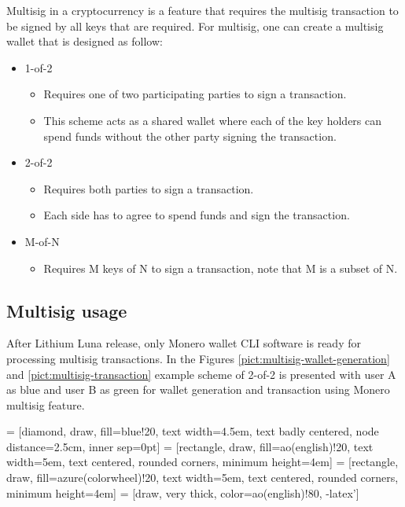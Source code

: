 \documentclass[
  printed, %
  table,   %
  nolof,     %
  nolot,     %
           oneside, color
]{fithesis3}
\begin{document}
Multisig in a cryptocurrency is a feature that requires the multisig transaction to be signed by all keys that are required. For multisig, one can create a multisig wallet that is designed as follow:
\begin{itemize}\itemsep0em
\item 1-of-2 
\begin{itemize}\itemsep0em \item Requires one of two participating parties to sign a transaction. \item This scheme acts as a shared wallet where each of the key holders can spend funds without the other party signing the transaction. \end{itemize}
\item 2-of-2 \begin{itemize}\itemsep0em \item  Requires both parties to sign a transaction. \item Each side has to agree to spend funds and sign the transaction.\end{itemize}
\item M-of-N \begin{itemize}\itemsep0em \item  Requires M keys of N to sign a transaction, note that M is a subset of N. \end{itemize}
\end{itemize}

\subsection{Multisig usage}
After Lithium Luna release, only Monero wallet CLI software is ready for processing multisig transactions. In the Figures \ref{pict:multisig-wallet-generation} and \ref{pict:multisig-transaction} example scheme of 2-of-2 is presented with user A as blue and user B as green for wallet generation and transaction using Monero multisig feature. 


\newpage
{}
 = [diamond, draw, fill=blue!20,
    text width=4.5em, text badly centered, node distance=2.5cm, inner sep=0pt]
 = [rectangle, draw, fill=ao(english)!20,
    text width=5em, text centered, rounded corners, minimum height=4em]
 = [rectangle, draw, fill=azure(colorwheel)!20,
    text width=5em, text centered, rounded corners, minimum height=4em]
 = [draw, very thick, color=ao(english)!80, -latex']
\end{document}
